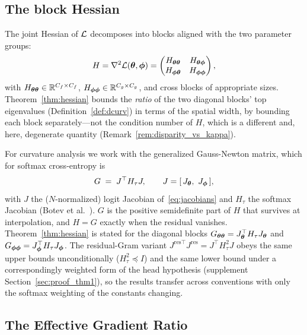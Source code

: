 \subsection{The block Hessian}

The joint Hessian of $\mathcal{L}$ decomposes into blocks aligned with the
two parameter groups:
\begin{equation}
\label{eq:block_hessian}
    H = \nabla^2 \mathcal{L}({\boldsymbol{\theta}}, {\boldsymbol{\phi}}) =
    \begin{pmatrix}
        H_{{\boldsymbol{\theta}}{\boldsymbol{\theta}}} & H_{{\boldsymbol{\theta}}{\boldsymbol{\phi}}} \\
        H_{{\boldsymbol{\phi}}{\boldsymbol{\theta}}} & H_{{\boldsymbol{\phi}}{\boldsymbol{\phi}}}
    \end{pmatrix},
\end{equation}
with $H_{{\boldsymbol{\theta}}{\boldsymbol{\theta}}} \in \mathbb{R}^{C_f \times C_f}$,
$H_{{\boldsymbol{\phi}}{\boldsymbol{\phi}}} \in \mathbb{R}^{C_g \times C_g}$, and cross blocks of
appropriate sizes. Theorem~\ref{thm:hessian} bounds the \emph{ratio}
of the two diagonal blocks' top eigenvalues
(Definition~\ref{def:dcurv}) in terms of the spatial width, by
bounding each block separately---not the condition number of $H$,
which is a different and, here, degenerate quantity
(Remark~\ref{rem:disparity_vs_kappa}).

For curvature analysis we work with the generalized Gauss-Newton
matrix, which for softmax cross-entropy is
\begin{equation}
\label{eq:ggn}
    G \;=\; J^\top H_\tau J,
    \qquad J = [\,J_{\boldsymbol{\theta}},\ J_{\boldsymbol{\phi}}\,],
\end{equation}
with $J$ the ($N$-normalized) logit Jacobian of~\eqref{eq:jacobians}
and $H_\tau$ the softmax Jacobian
(Botev et al.~\cite{botev2017practical}). $G$ is the positive
semidefinite part of $H$ that survives at interpolation, and
$H = G$ exactly when the residual vanishes.
Theorem~\ref{thm:hessian} is stated for the diagonal blocks
$G_{{\boldsymbol{\theta}}{\boldsymbol{\theta}}} = J_{\boldsymbol{\theta}}^\top H_\tau J_{\boldsymbol{\theta}}$ and
$G_{{\boldsymbol{\phi}}{\boldsymbol{\phi}}} = J_{\boldsymbol{\phi}}^\top H_\tau J_{\boldsymbol{\phi}}$. The
residual-Gram variant $J^{\mathrm{res}\top} J^{\mathrm{res}} =
J^\top H_\tau^2 J$ obeys the same upper bounds unconditionally
($H_\tau^2 \preceq I$) and the same lower bound under a
correspondingly weighted form of the head hypothesis (supplement
Section~\ref{sec:proof_thm1}), so the results transfer across
conventions with only the softmax weighting of the constants
changing.

\subsection{The Effective Gradient Ratio}

